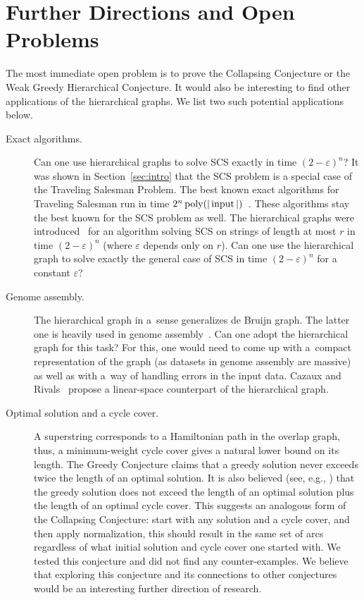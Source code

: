 \section{Further Directions and Open Problems}
The most immediate open problem is to prove the Collapsing Conjecture or the Weak Greedy Hierarchical Conjecture.
It would also be interesting to find other applications of the 
hierarchical graphs. We list two such potential applications below.
\begin{description}
\item[Exact algorithms.] Can one use hierarchical graphs to solve SCS exactly in time $(2-\varepsilon)^n$?
It was shown in Section~\ref{sec:intro} that the SCS problem is a special case of the Traveling Salesman Problem. The best known exact algorithms for Traveling Salesman run in time $2^n \operatorname{poly}(|\operatorname{input}|)$~\cite{B1962, HK1971, KGK1977, K1982, BF1996}. These algorithms stay the best known for the SCS problem as well. The hierarchical graphs were introduced~\cite{scs_exact} for an algorithm solving SCS on strings of length at most $r$ in time $(2-\varepsilon)^n$ (where $\varepsilon$ depends only on $r$). Can one use the hierarchical graph to solve exactly the general case of SCS in time $(2-\varepsilon)^n$ for a constant $\varepsilon$?

\item[Genome assembly.] The hierarchical graph in a~sense
generalizes de Bruijn graph. The latter one is heavily used
in genome assembly~\cite{pevzner2001eulerian}.
Can one adopt the hierarchical graph for this task? For this, one
would need to come up with a~compact representation of the graph
(as datasets in genome assembly are massive) as well as with a~way of
handling errors in the input data. Cazaux and Rivals~\cite{cazaux2018hierarchical} propose a linear-space counterpart of the hierarchical graph.

\item[Optimal solution and a cycle cover.] A superstring corresponds to a Hamiltonian path in the overlap graph, thus, a minimum-weight cycle cover gives a natural lower bound on its length. 
The Greedy Conjecture claims that a greedy solution never exceeds twice the length of an optimal solution. It is also  believed (see, e.g., \cite{weinard2006greedy,laube2005conditional}) that the greedy solution does not exceed the length of an optimal solution plus the length of an optimal cycle cover. This suggests an analogous form of the Collapsing Conjecture: start with any solution and a cycle cover, and then apply normalization, this should result in the same set of arcs regardless of what initial solution and cycle cover one started with. We tested this conjecture and did not find any counter-examples. We believe that exploring this conjecture and its connections to other conjectures would be an interesting further direction of research.
\end{description}
